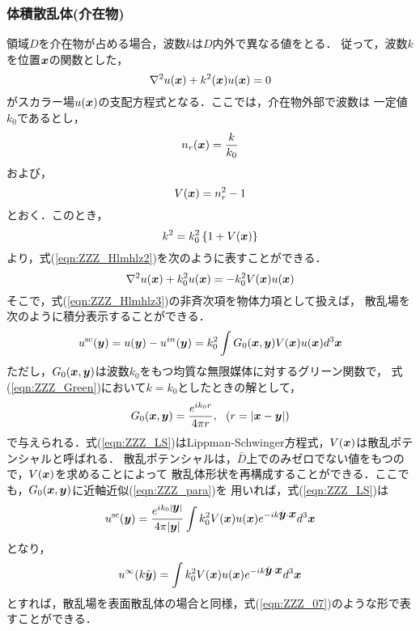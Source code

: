 \subsubsection{体積散乱体(介在物)}
領域$D$を介在物が占める場合，波数$k$は$D$内外で異なる値をとる．
従って，波数$k$を位置$\mbox{\boldmath $x$}$の関数とした，
\begin{equation}
	\nabla^2 u(\mbox{\boldmath $x$}) + k^2(\mbox{\boldmath $x$}) u(\mbox{\boldmath $x$}) =0
	\label{eqn:ZZZ_Hlmhlz2}
\end{equation}
がスカラー場$u(\mbox{\boldmath $x$})$の支配方程式となる．ここでは，介在物外部で波数は
一定値$k_0$であるとし，
\begin{equation}
	n_r(\mbox{\boldmath $x$}) =\frac{k}{k_0}
	\label{eqn:ZZZ_13}
\end{equation}
および，
\begin{equation}
	V(\mbox{\boldmath $x$})=n_r^2-1
	\label{eqn:ZZZ_14}
\end{equation}
とおく．このとき，
\begin{equation}
	k^2=k_0^2\left\{ 1 + V(\mbox{\boldmath $x$}) \right\}
	\label{eqn:ZZZ_15}
\end{equation}
より，式(\ref{eqn:ZZZ_Hlmhlz2})を次のように表すことができる．
\begin{equation}
	\nabla^2 u(\mbox{\boldmath $x$}) + k_0^2 u(\mbox{\boldmath $x$}) = -k_0^2 V(\mbox{\boldmath $x$})u(\mbox{\boldmath $x$})
	\label{eqn:ZZZ_Hlmhlz3}
\end{equation}
そこで，式(\ref{eqn:ZZZ_Hlmhlz3})の非斉次項を物体力項として扱えば，
散乱場を次のように積分表示することができる．
\begin{equation}
	u^{\rm sc}(\mbox{\boldmath $y$})
	=u(\mbox{\boldmath $y$})-u^{in}(\mbox{\boldmath $y$}) 
	= k_0^2\int G_0(\mbox{\boldmath $x$},\mbox{\boldmath $y$})V(\mbox{\boldmath $x$})u(\mbox{\boldmath $x$}) d^3\mbox{\boldmath $x$}
	\label{eqn:ZZZ_LS}
\end{equation}
ただし，$G_0(\mbox{\boldmath $x$},\mbox{\boldmath $y$})$は波数$k_0$をもつ均質な無限媒体に対するグリーン関数で，
式(\ref{eqn:ZZZ_Green})において$k=k_0$としたときの解として，
\begin{equation}
	G_0(\mbox{\boldmath $x$},\mbox{\boldmath $y$})=\frac{e^{ik_0r}}{4\pi r}, \ \ (r=|\mbox{\boldmath $x$}-\mbox{\boldmath $y$}|)
	\label{eqn:ZZZ_G0}
\end{equation}
で与えられる．式(\ref{eqn:ZZZ_LS})はLippman-Schwinger方程式，$V(\mbox{\boldmath $x$})$は散乱ポテンシャルと呼ばれる．
散乱ポテンシャルは，$\bar D$上でのみゼロでない値をもつので，$V(\mbox{\boldmath $x$})$を求めることによって
散乱体形状を再構成することができる．ここでも，$G_0(\mbox{\boldmath $x$},\mbox{\boldmath $y$})$に近軸近似(\ref{eqn:ZZZ_para})を
用いれば，式(\ref{eqn:ZZZ_LS})は
\begin{equation}
	u^{\rm sc}(\mbox{\boldmath $y$})
	=
	\frac{e^{ik_0|\mbox{\boldmath $y$}|}}{4\pi |\mbox{\boldmath $y$}|}
	\int
	k_0^2 V(\mbox{\boldmath $x$})u(\mbox{\boldmath $x$}) e^{-ik\hat{\mbox{\boldmath $y$}}\cdot \mbox{\boldmath $x$}}d^3\mbox{\boldmath $x$}
	\label{eqn:ZZZ_16}
\end{equation}
となり，
\begin{equation}
	u^{\infty}(k\hat{\mbox{\boldmath $y$}})
	=
	\int
	k_0^2 V(\mbox{\boldmath $x$})u(\mbox{\boldmath $x$}) e^{-ik\hat{\mbox{\boldmath $y$}}\cdot \mbox{\boldmath $x$}}d^3\mbox{\boldmath $x$}
	\label{eqn:ZZZ_U_vol}
\end{equation}
とすれば，散乱場を表面散乱体の場合と同様，式(\ref{eqn:ZZZ_07})のような形で表すことができる．
%
